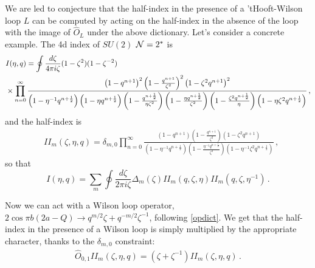 \documentclass[11pt,letterpaper]{article}
\numberwithin{equation}{section}
\begin{document}
We are led to conjecture that the half-index in the presence of a 'tHooft-Wilson loop $L$ can be computed by acting on the half-index in the absence of the loop
with the image of $\hat O_L$ under the above dictionary. Let's consider a concrete example.
The 4d index of $SU(2)$ ${\cal N}=2^*$ is
%
\begin{align}
&I(\eta,q) = \oint \frac{d\zeta}{4\pi i\zeta} (1-\zeta^2)(1-\zeta^{-2}) \\\notag &\times \prod_{n=0}^{\infty} \frac{\left(1-q^{n+1}\right)^2 \left(1-\frac{q^{n+1}}{\zeta^2}\right)^2 \left(1-\zeta^2 q^{n+1}\right)^2}{\left(1-\eta^{-1}q^{n+\frac{1}{2}}\right) \left(1-\eta q^{n+\frac{1}{2}}\right)
   \left(1-\frac{q^{n+\frac{1}{2}}}{\eta \zeta^2}\right) \left(1-\frac{\eta q^{n+\frac{1}{2}}}{\zeta^2}\right) \left(1-\frac{\zeta^2 q^{n+\frac{1}{2}}}{\eta}\right) \left(1-\eta \zeta^2 q^{n+\frac{1}{2}}\right)}\,,
\end{align}
%
and the half-index is
\begin{align}
&I\!I_m(\zeta,\eta,q) = \delta_{m,0} \prod_{n=0}^{\infty} \frac{\left(1-q^{n+1}\right)\left(1-\frac{q^{n+1}}{\zeta^2}\right) \left(1-\zeta^2 q^{n+1}\right)}{ \left(1-\eta^{-1} q^{n+\frac{1}{2}}\right)
   \left(1-\frac{\eta^{-1} q^{n+\frac{1}{2}}}{\zeta^2}\right) \left(1-\eta^{-1} \zeta^2 q^{n+\frac{1}{2}}\right)}\,,
\end{align}
so that
\begin{equation}
I(\eta,q) =  \sum_m \oint \frac{d\zeta}{2\pi i\zeta} \Delta_m(\zeta) I\!I_m(q,\zeta,\eta) I\!I_m(q,\zeta,\eta^{-1})\,.
\end{equation}

Now we can act with a Wilson loop operator, $2 \cos \pi b (2a-Q) \to q^{m/2} \zeta+q^{-m/2} \zeta^{-1}$, following \eqref{opdict}.
We get that the half-index in the presence of a Wilson loop is simply multiplied by the appropriate character, thanks to the $\delta_{m,0}$ constraint:
\begin{align}
\hat O_{0,1} I\!I_m(\zeta,\eta,q) = \left(\zeta + \zeta^{-1} \right) I\!I_m(\zeta,\eta,q)\,.
\end{align}
\end{document}
